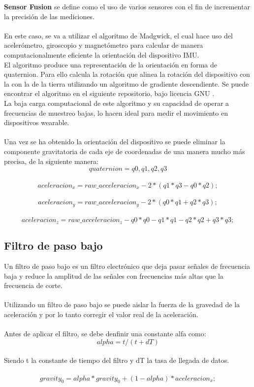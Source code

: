 \textbf{Sensor Fusion} se define como el uso de varios sensores con el fin de incrementar la precisión de las mediciones.
\\
\\
En este caso, se va a utilizar el algoritmo de Madgwick, el cual hace uso del acelerómetro, giroscopio y magnetómetro para calcular de manera computacionalmente eficiente la orientación del dispositivo IMU\cite{madgwick}.
\\
El algoritmo produce una representación de la orientación en forma de quaternion\cite{quaternion}. Para ello calcula la rotación que alinea la rotación del dispositivo con la con la de la tierra utilizando un algoritmo de gradiente descendiente. Se puede encontrar el algoritmo en el siguiente repositorio, bajo licencia GNU \cite{algoritmo}.
\\
La baja carga computacional de este algoritmo y su capacidad de operar a frecuencias de muestreo bajas, lo hacen ideal para medir el movimiento en dispositivos wearable.
\\
\\
Una vez se ha obtenido la orientación del dispositivo se puede eliminar la componente gravitatoria de cada eje de coordenadas de una manera mucho más precisa, de la siguiente manera:
\\
\[quaternion = q0,q1,q2,q3\]
\\
\[aceleracion_x = raw\_acceleracion_x - 2 * (q1 * q3 - q0 * q2);\]
\\
\[aceleracion_y = raw\_acceleracion_y - 2 * (q0 * q1 + q2 * q3);\]
\\
\[aceleracion_z = raw\_acceleracion_z - q0 * q0 - q1 * q1 - q2 * q2 + q3 * q3;\]

\subsection{Filtro de paso bajo}

Un filtro de paso bajo es un filtro electrónico que deja pasar señales de frecuencia baja y reduce la amplitud de las señales con frecuencias más altas que la frecuencia de corte.
\\
\\
Utilizando un filtro de paso bajo se puede aislar la fuerza de la gravedad de la aceleración y por lo tanto corregir el valor real de la aceleración.
\\
\\
Antes de aplicar el filtro, se debe denfinir una constante alfa como:
\\
\[alpha = t / (t + dT)\]
\\
Siendo t la constante de tiempo del filtro y dT la tasa de llegada de datos.
\\
\\
\[gravity_0 = alpha * gravity_0 + (1 - alpha) * aceleracion_x;\]

